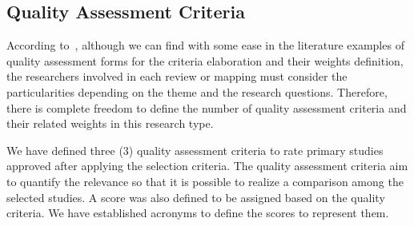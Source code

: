  
\subsection{Quality Assessment Criteria} \label{ssec_slm:qualityCriteria}

According to~\cite{Nakagawa:2017}, although we can find with some ease in the literature examples of quality assessment forms for the criteria elaboration and their weights definition, the researchers involved in each review or mapping must consider the particularities depending on the theme and the research questions.
Therefore, there is complete freedom to define the number of quality assessment criteria and their related weights in this research type.

We have defined three (3) quality assessment criteria to rate primary studies approved after applying the selection criteria.
The quality assessment criteria aim to quantify the relevance so that it is possible to realize a comparison among the selected studies.
A score was also defined to be assigned based on the quality criteria.
We have established acronyms to define the scores to represent them.

